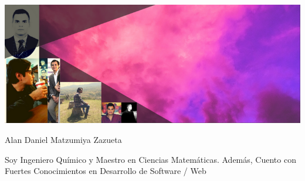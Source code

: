 \vspace{-3pt}
\colorbox{darkcol}{}


\includegraphics[width=0.9995\linewidth]{../../img/banner.png}	%

%
\vspace{-127pt}
\hspace{0.32\linewidth}
\colorbox{darkcol}{
    \parbox{0.60\linewidth}{\vspace{-1.15mm}\hspace{-2.10mm}\colorbox{fgreycol}{\parbox{1.025\linewidth}{\textcolor{lightcol}{\hspace{0.22\linewidth}Alan Daniel Matzumiya Zazueta}}}
        \vspace{-4.5mm}
        \begin{center}
             \textcolor{lightcol}{Soy Ingeniero Qu\'imico y Maestro en Ciencias Matem\'aticas. Adem\'as, Cuento con Fuertes Conocimientos en Desarrollo de Software / Web}
        \end{center}
    }
}
\vspace{59.5pt}
%